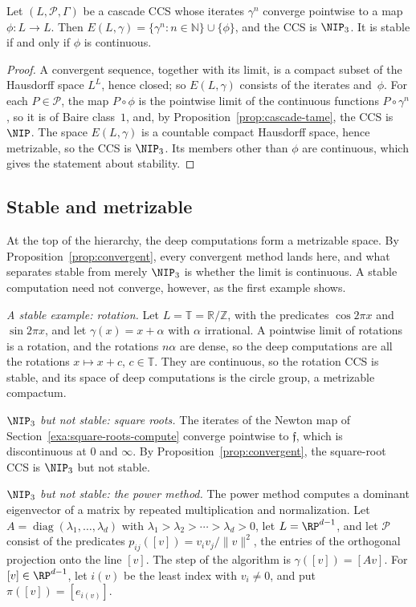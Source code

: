\begin{prop}\label{prop:convergent}
Let $(L,\mathcal{P},\Gamma)$ be a cascade CCS whose iterates $\gamma^n$
converge pointwise to a map $\phi\colon L\to L$.
Then $E(L,\gamma)=\{\gamma^n:n\in\mathbb{N}\}\cup\{\phi\}$, and the CCS is
$\NIP_3$.
It is stable if and only if $\phi$ is continuous.
\end{prop}

\begin{proof}
A convergent sequence, together with its limit, is a compact subset of the
Hausdorff space $L^L$, hence closed; so $E(L,\gamma)$ consists of the iterates
and~$\phi$.
For each $P\in\mathcal{P}$, the map $P\circ\phi$ is the pointwise limit of the
continuous functions $P\circ\gamma^n$, so it is of Baire class~$1$, and, by
Proposition~\ref{prop:cascade-tame}, the CCS is $\NIP$.
The space $E(L,\gamma)$ is a countable compact Hausdorff space, hence
metrizable, so the CCS is $\NIP_3$.
Its members other than $\phi$ are continuous, which gives the statement about
stability.
\end{proof}


\subsection{Stable and metrizable}
\label{sec:ex-NIP3}
At the top of the hierarchy, the deep computations form a metrizable space.
By Proposition~\ref{prop:convergent}, every convergent method lands here, and
what separates stable from merely $\NIP_3$ is whether the limit is continuous.
A stable computation need not converge, however, as the first example shows.

\emph{A stable example: rotation.}
Let $L=\mathbb{T}=\mathbb{R}/\mathbb{Z}$, with the predicates $\cos2\pi x$ and
$\sin2\pi x$, and let $\gamma(x)=x+\alpha$ with $\alpha$ irrational.
A pointwise limit of rotations is a rotation, and the rotations $n\alpha$ are
dense, so the deep computations are all the rotations
$x\mapsto x+c$, $c\in\mathbb{T}$.
They are continuous, so the rotation CCS is stable, and its space of deep
computations is the circle group, a metrizable compactum.

\emph{$\NIP_3$ but not stable: square roots.}
The iterates of the Newton map of Section~\ref{exa:square-roots-compute}
converge pointwise to $\mathfrak f$, which is discontinuous at $0$ and $\infty$.
By Proposition~\ref{prop:convergent}, the square-root CCS is $\NIP_3$ but not
stable.

\emph{$\NIP_3$ but not stable: the power method.}
The power method computes a dominant eigenvector of a matrix by repeated
multiplication and normalization.
Let $A=\operatorname{diag}(\lambda_1,\dots,\lambda_d)$ with
$\lambda_1>\lambda_2>\cdots>\lambda_d>0$, let $L=\RP^{d-1}$, and let
$\mathcal{P}$ consist of the predicates
$p_{ij}([v])=v_iv_j/\|v\|^2$, the entries of the orthogonal projection onto the
line $[v]$.
The step of the algorithm is $\gamma([v])=[Av]$.
For $[v]\in\RP^{d-1}$, let $i(v)$ be the least index with $v_i\ne0$, and put
$\pi([v])=[e_{i(v)}]$.

